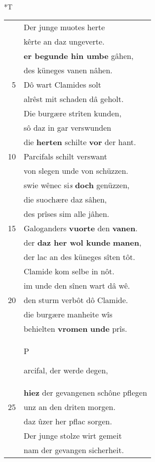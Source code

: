 \documentclass[8pt,a4paper,notitlepage]{article}
\begin{document}
\begin{table}[ht]
\begin{minipage}[t]{0.5\linewidth}
\end{minipage}
\hspace{0.5cm}
\begin{minipage}[t]{0.5\linewidth}
\small
\begin{center}*T
\end{center}
\begin{tabular}{rl}
 & Der junge muotes herte\\ 
 & kêrte an daz ungeverte.\\ 
 & \textbf{er begunde hin umbe} gâhen,\\ 
 & des küneges vanen nâhen.\\ 
5 & Dô wart Clamides solt\\ 
 & alrêst mit schaden dâ geholt.\\ 
 & Die burgære strîten kunden,\\ 
 & sô daz in gar verswunden\\ 
 & die \textbf{herten} schilte \textbf{vor} der hant.\\ 
10 & Parcifals schilt verswant\\ 
 & von slegen unde von schüzzen.\\ 
 & swie wênec si\textit{s} \textbf{doch} genüzzen,\\ 
 & die suochære daz sâhen,\\ 
 & des prîses sim alle jâhen.\\ 
15 & Galoganders \textbf{vuorte} den \textbf{vanen}.\\ 
 & der \textbf{daz her wol kunde} \textbf{manen},\\ 
 & der lac an des küneges sîten tôt.\\ 
 & Clamide kom selbe in nôt.\\ 
 & im unde den sînen wart dâ wê.\\ 
20 & den sturm verbôt dô Clamide.\\ 
 & die burgære manheite wîs\\ 
 & behielten \textbf{vromen} \textbf{unde} prîs.\\ 
 & \begin{large}P\end{large}arcifal, der werde degen,\\ 
 & \textbf{hiez} der gevangenen schône pflegen\\ 
25 & unz an den driten morgen.\\ 
 & daz ûzer her pflac sorgen.\\ 
 & Der junge stolze wirt gemeit\\ 
 & nam der gevangen sicherheit.\\ 

\end{tabular}
\end{minipage}
\end{table}
\end{document}
